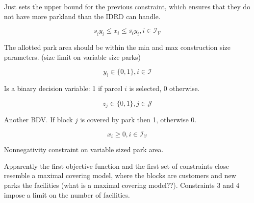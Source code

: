 \documentclass{article}
\begin{document}
Just sets the upper bound for the previous constraint, which ensures that they do not have more parkland than the IDRD can handle.

\begin{equation}
\underline{s}_iy_i \leq x_i \leq \bar{s_i}y_i, i \in \mathcal{I_V}
\end{equation}

The allotted park area should be within the min and max construction size parameters. (size limit on variable size parks)

\begin{equation}
y_i \in \{0,1\}, i \in \mathcal{I}
\end{equation}

Is a binary decision variable: 1 if parcel $i$ is selected, 0 otherwise.

\begin{equation}
z_j \in \{0,1\}, j \in \mathcal{J}
\end{equation}

Another BDV. If block $j$ is covered by park then 1, otherwise 0.

\begin{equation}
x_i \geq 0, i \in \mathcal{I_V}
\end{equation}

Nonnegativity constraint on variable sized park area. \newline \newline


Apparently the first objective function and the first set of constraints close resemble a maximal covering model, where the blocks are customers and new parks the facilities (what is a maximal covering model??). Constraints 3 and 4 impose a limit on the number of facilities.

%
%
\end{document}
